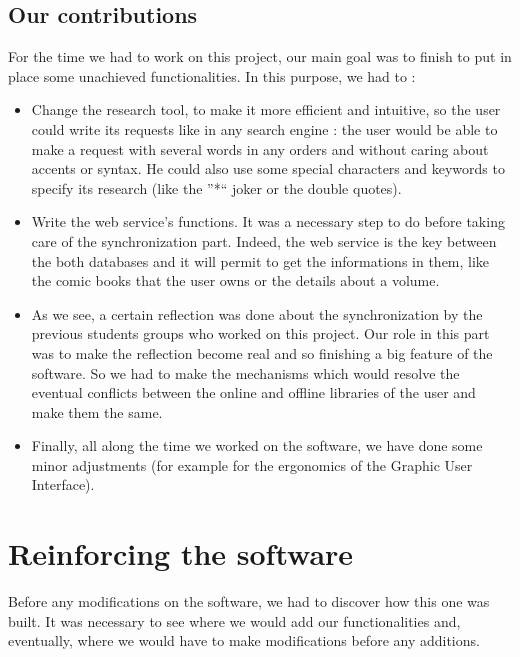 \documentclass[11pt]{report} %
\begin{document}
\section{Our contributions}
For the time we had to work on this project, our main goal was to finish to put in place some unachieved functionalities. In this purpose, we had to :
\begin{itemize}
\item Change the research tool, to make it more efficient and intuitive, so the user could write its requests like in any search engine : the user would be able to make a request with several words in any orders and without caring about accents or syntax. He could also use some special characters and keywords to specify its research (like the ''*`` joker or the double quotes).
\item Write the web service's functions. It was a necessary step to do before taking care of the synchronization part. Indeed, the web service is the key between the both databases and it will permit to get the informations in them, like the comic books that the user owns or the details about a volume.
\item As we see, a certain reflection was done about the synchronization by the previous students groups who worked on this project. Our role in this part was to make the reflection become real and so finishing a big feature of the software. So we had to make the mechanisms which would resolve the eventual conflicts between the online and offline libraries of the user and make them the same.
\item Finally, all along the time we worked on the software, we have done some minor adjustments (for example for the ergonomics of the Graphic User Interface).

\end{itemize}


%
% 

\chapter{Reinforcing the software}
Before any modifications on the software, we had to discover how this one was built. It was necessary to see where we would add our functionalities and, eventually, where we would have to make modifications before any additions.
\end{document}
